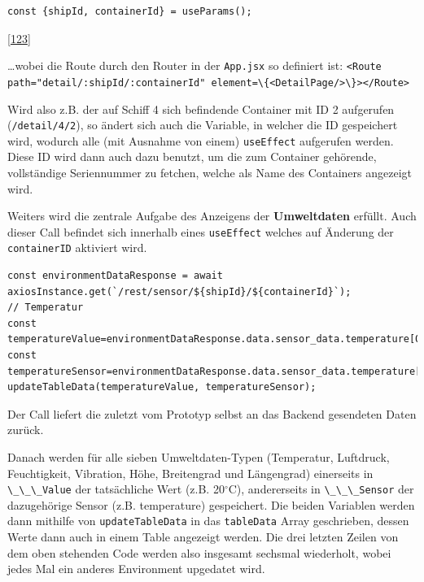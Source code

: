 \documentclass[
    headings=optiontotocandhead,%
    twoside,
    numbers=noenddot,%
    12pt, %
    titlepage, %
    parskip=full, %
    listof=leveldown, 
    numbers=noenddot, %
    a4paper,DIV=14,
    BCOR=15mm,
]{scrbook}
\newcommand{\passthrough}[1]{#1}
\begin{document}
\begin{lstlisting}[caption={Verwendung von useParams()}]
const {shipId, containerId} = useParams();
\end{lstlisting}

{[}\protect\hyperlink{ref-Refine-ReactRouter}{123}{]}

\ldots wobei die Route durch den Router in der
\passthrough{\lstinline!App.jsx!} so definiert ist:
\passthrough{\lstinline!<Route path="detail/:shipId/:containerId" element=\{<DetailPage/>\}></Route>!}

Wird also z.B. der auf Schiff 4 sich befindende Container mit ID 2
aufgerufen (\passthrough{\lstinline!/detail/4/2!}), so ändert sich auch
die Variable, in welcher die ID gespeichert wird, wodurch alle (mit
Ausnahme von einem) \passthrough{\lstinline!useEffect!} aufgerufen
werden. Diese ID wird dann auch dazu benutzt, um die zum Container
gehörende, vollständige Seriennummer zu fetchen, welche als Name des
Containers angezeigt wird.

Weiters wird die zentrale Aufgabe des Anzeigens der \textbf{Umweltdaten}
erfüllt. Auch dieser Call befindet sich innerhalb eines
\passthrough{\lstinline!useEffect!} welches auf Änderung der
\passthrough{\lstinline!containerID!} aktiviert wird.

\begin{lstlisting}[caption={Fetchen und speichern einer der sieben Umweltdaten}]
const environmentDataResponse = await axiosInstance.get(`/rest/sensor/${shipId}/${containerId}`);
// Temperatur
const temperatureValue=environmentDataResponse.data.sensor_data.temperature[0].value;
const temperatureSensor=environmentDataResponse.data.sensor_data.temperature[0].sensor;
updateTableData(temperatureValue, temperatureSensor);
\end{lstlisting}

Der Call liefert die zuletzt vom Prototyp selbst an das Backend
gesendeten Daten zurück.

Danach werden für alle sieben Umweltdaten-Typen (Temperatur, Luftdruck,
Feuchtigkeit, Vibration, Höhe, Breitengrad und Längengrad) einerseits in
\passthrough{\lstinline!\_\_\_Value!} der tatsächliche Wert (z.B.
20\(^\circ\)C), andererseits in \passthrough{\lstinline!\_\_\_Sensor!}
der dazugehörige Sensor (z.B. temperature) gespeichert. Die beiden
Variablen werden dann mithilfe von
\passthrough{\lstinline!updateTableData!} in das
\passthrough{\lstinline!tableData!} Array geschrieben, dessen Werte dann
auch in einem Table angezeigt werden. Die drei letzten Zeilen von dem
oben stehenden Code werden also insgesamt sechsmal wiederholt, wobei
jedes Mal ein anderes Environment upgedatet wird.
\end{document}
